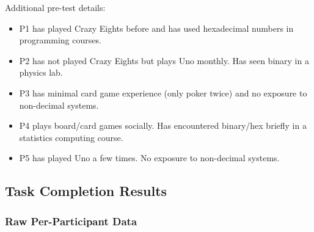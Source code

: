 \documentclass[12pt, titlepage]{article}
\begin{document}
\noindent Additional pre-test details:
\begin{itemize}
  \item P1 has played Crazy Eights before and has used hexadecimal numbers in programming courses.
  \item P2 has not played Crazy Eights but plays Uno monthly. Has seen binary in a physics lab.
  \item P3 has minimal card game experience (only poker twice) and no exposure to non-decimal systems.
  \item P4 plays board/card games socially. Has encountered binary/hex briefly in a statistics computing course.
  \item P5 has played Uno a few times. No exposure to non-decimal systems.
\end{itemize}

\subsection{Task Completion Results}

\subsubsection{Raw Per-Participant Data}
\end{document}
